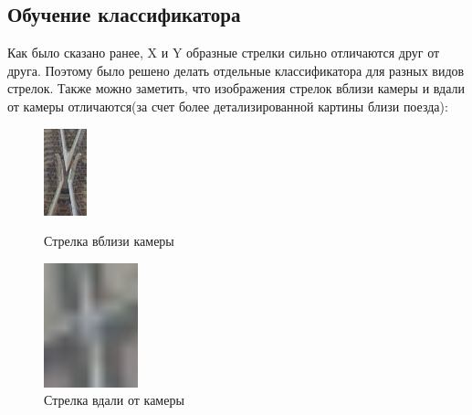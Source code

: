 \subsection{Обучение классификатора}
Как было сказано ранее, X и Y образные стрелки сильно отличаются друг от друга. Поэтому было решено делать отдельные классификатора для разных видов стрелок. Также можно заметить, что изображения стрелок вблизи камеры и вдали от камеры отличаются(за счет более детализированной картины близи поезда):
\begin{figure}[!h]
	\centering
	\begin{minipage}{0.3\textwidth}
		\centering
		\includegraphics[width=0.3\linewidth]{pictures/screenshot3}
		\caption[X]{Стрелка вблизи камеры}
		\label{fig:x}
	\end{minipage}
	\begin{minipage}{0.3\textwidth}
		\centering
		\includegraphics[width=0.3\linewidth]{pictures/screenshot5}
		\caption[Y]{Стрелка вдали от камеры}
		\label{fig:y}
	\end{minipage}
\end{figure}

